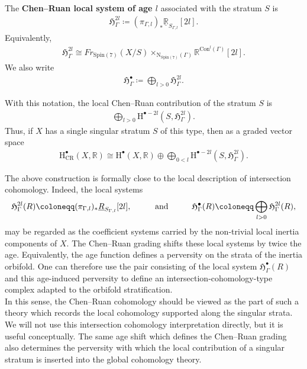 \documentclass[psamsfonts]{amsart}
\theoremstyle{plain}
\theoremstyle{definition}{
\newtheorem{defi}{Definition}[section]
\newtheorem{ass}{Assumption}
\newtheorem*{nota}{Notation}}
\theoremstyle{remark}{
\newtheorem{rem}{Remark}
\newtheorem{ex}{Example}}
\theoremstyle{plain}{
\newtheorem{thm}{Theorem}[section]
\newtheorem{lem}{Lemma}[section]
\newtheorem{cor}{Corollary}[section]
\newtheorem{prop}{Proposition}[section]
\newtheorem{con}{Conjecture}[section]}
\newcommand{\m}[1]{{\mathrm{#1}}}
\newcommand{\und}[1]{\hspace{#1}\text{and}\hspace{#1}}
\begin{document}
\begin{defi}
The \textbf{Chen--Ruan local system of age $l$} associated with the stratum
$S$ is
\begin{align*}
        \mathfrak{H}^{2l}_\Gamma
        \coloneqq
        (\pi_{\Gamma,l})_*\underline{\mathbb{R}}_{S_{\Gamma,l}}[2l].
\end{align*}
Equivalently,
\begin{align*}
        \mathfrak{H}^{2l}_\Gamma
        \cong
        Fr_{\m{Spin}(7)}(X/S)
        \times_{\m{N}_{\m{Spin}(7)}(\Gamma)}
        \mathbb{R}^{\m{Con}^l(\Gamma)}[2l].
\end{align*}
We also write
\begin{align*}
        \mathfrak{H}^\bullet_\Gamma
        \coloneqq
        \bigoplus_{l>0}\mathfrak{H}^{2l}_\Gamma .
\end{align*}
\end{defi}


With this notation, the local Chen--Ruan contribution of the stratum $S$ is
\begin{align*}
        \bigoplus_{l>0}
        \m{H}^{\bullet-2l}(S,\mathfrak{H}^{2l}_\Gamma).
\end{align*}
Thus, if $X$ has a single singular stratum $S$ of this type, then as a graded vector space
\begin{align}
\label{CRcohomolocalsystems}
        \m{H}^\bullet_{\m{CR}}(X,\mathbb{R})
        \cong\m{H}^\bullet(X,\mathbb{R})
        \oplus\bigoplus_{0<l}\m{H}^{\bullet-2l}(S,\mathfrak{H}^{2l}_\Gamma).
\end{align}

\begin{rem}
The above construction is formally close to the local description of intersection
cohomology. Indeed, the local systems
\begin{align*}
\mathfrak{H}^{2l}_\Gamma(R)
\coloneqq(\pi_{\Gamma,l})_*\underline{R}_{S_{\Gamma,l}}[2l],
\und{1.0cm} \mathfrak{H}^\bullet_\Gamma(R)\coloneqq
\bigoplus_{l>0}\mathfrak{H}^{2l}_\Gamma(R),
\end{align*}
may be regarded as the coefficient systems carried by the non-trivial local inertia components of $X$. The Chen--Ruan grading shifts these local systems by twice the age. Equivalently, the age function defines a perversity on the strata of the inertia orbifold. One can therefore use the pair consisting of the local system $\mathfrak{H}^\bullet_\Gamma(R)$ and this age-induced perversity to define an intersection-cohomology-type complex adapted to the orbifold stratification.\\

In this sense, the Chen--Ruan cohomology should be viewed as the part of such a theory which records the local cohomology supported along the singular strata. We will not use this intersection cohomology interpretation directly, but it is useful conceptually. The same age shift which defines the Chen--Ruan grading also determines the perversity with which the local contribution of a singular stratum is inserted into the global cohomology theory.
\end{rem}
\end{document}

